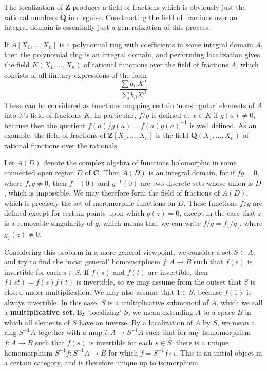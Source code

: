 \begin{example}
    The localization of $\mathbf{Z}$ produces a field of fractions which is obviously just the rational numbers $\mathbf{Q}$ in disguise. Constructing the field of fractions over an integral domain is essentially just a generalization of this process.
\end{example}

\begin{example}
    If $A[X_1, \dots, X_n]$ is a polynomial ring with coefficients in some integral domain $A$, then the polynomial ring is an integral domain, and performing localization gives the field $K(X_1, \dots, X_n)$ of rational functions over the field of fractions $A$, which consists of all finitary expressions of the form
    \[ \frac{\sum a_\alpha X^\alpha}{\sum b_\beta X^\beta} \]
    These can be considered as functions mapping certain `nonsingular' elements of $A$ into it's field of fractions $K$. In particular, $f/g$ is defined at $x \in K$ if $g(a) \neq 0$, because then the quotient $f(a)/g(a) = f(a) g(a)^{-1}$ is well defined. As an example, the field of fractions of $\mathbf{Z}[X_1, \dots, X_n]$ is the field $\mathbf{Q}(X_1, \dots, X_n)$ of rational functions over the rationals.
\end{example}

\begin{example}
    Let $A(D)$ denote the complex algebra of functions holomorphic in some connected open region $D$ of $\mathbf{C}$. Then $A(D)$ is an integral domain, for if $fg = 0$, where $f,g \neq 0$, then $f^{-1}(0)$ and $g^{-1}(0)$ are two discrete sets whose union is $D$, which is impossible. We may therefore form the field of fractions of $A(D)$, which is precisely the set of meromorphic functions on $D$. These functions $f/g$ are defined except for certain points upon which $g(z) = 0$, except in the case that $z$ is a removable singularity of $g$, which means that we can write $f/g = f_1/g_1$, where $g_1(z) \neq 0$.
\end{example}

Considering this problem in a more general viewpoint, we consider a set $S \subset A$, and try to find the `most general' homomorphism $f: A \to B$ such that $f(s)$ is invertible for each $s \in S$. If $f(s)$ and $f(t)$ are invertible, then $f(st) = f(s)f(t)$ is invertible, so we may assume from the outset that $S$ is closed under multiplication. We may also assume that $1 \in S$, because $f(1)$ is always invertible. In this case, $S$ is a multiplicative submonoid of $A$, which we call a {\bf multiplicative set}. By `localizing' $S$, we mean extending $A$ to a space $B$ in which all elements of $S$ have an inverse. By a localization of $A$ by $S$, we mean a ring $S^{-1}A$ together with a map $i: A \to S^{-1}A$ such that for any homomorphism $f:A \to B$ such that $f(s)$ is invertible for each $s \in S$, there is a unique homomorphism $S^{-1}f: S^{-1}A \to B$ for which $f = S^{-1}f \circ i$. This is an initial object in a certain category, and is therefore unique up to isomorphism.

